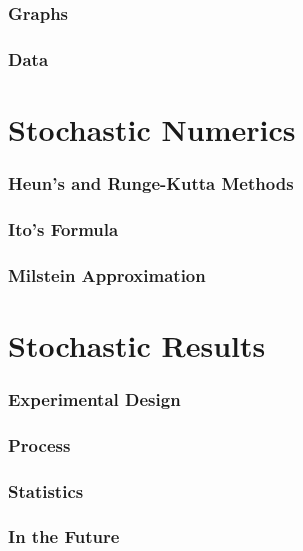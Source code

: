 \documentclass{beamer}   %
\begin{document}
\begin{frame}
    \frametitle{Graphs}

\end{frame}





\begin{frame}
    \frametitle{Data}

\end{frame}



\section{Stochastic Numerics}

\begin{frame}
    \frametitle{Heun's and Runge-Kutta Methods}

\end{frame}





\begin{frame}
    \frametitle{Ito's Formula}

\end{frame}





\begin{frame}
    \frametitle{Milstein Approximation}

\end{frame}



\section{Stochastic Results}

\begin{frame}
    \frametitle{Experimental Design}

\end{frame}




\begin{frame}
  \frametitle{Process}

\end{frame}




\begin{frame}
  \frametitle{Statistics}

\end{frame}




\begin{frame}
    \frametitle{In the Future}
    
\end{frame}

\end{document}
